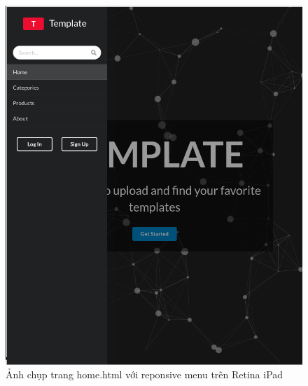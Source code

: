 \documentclass[a4paper]{article}
\begin{document}
\begin{figure}[H]
\begin{center}
\includegraphics[page=1, scale=0.215]{screenshot/retina2.png}
\caption{Ảnh chụp trang home.html với reponsive menu trên Retina iPad}
\end{center}
\end{figure}
\end{document}
